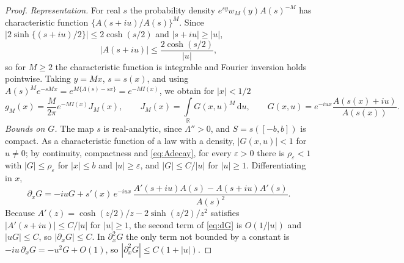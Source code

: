 \documentclass{math}
\let\TJMoriginalint\int
\renewcommand{\int}{\TJMoriginalint\limits}
\newcommand{\R}{\mathbb R}
\newcommand{\ii}{\mathit{i}}
\newcommand{\dd}{\,\mathrm d}
\begin{document}
\begin{proof}
\emph{Representation.} For real $s$ the probability density $e^{sy}w_M(y)A(s)^{-M}$ has characteristic function $\{A(s+\ii u)/A(s)\}^M$. Since $|2\sinh\{(s+\ii u)/2\}|\le2\cosh(s/2)$ and $|s+\ii u|\ge|u|$,
\begin{equation}\label{eq:Adecay}
|A(s+\ii u)|\le\frac{2\cosh(s/2)}{|u|},
\end{equation}
so for $M\ge2$ the characteristic function is integrable and Fourier inversion holds pointwise. Taking $y=Mx$, $s=s(x)$, and using $A(s)^Me^{-sMx}=e^{M\{\Lambda(s)-sx\}}=e^{-MI(x)}$, we obtain for $|x|<1/2$
\begin{equation}\label{eq:rep}
g_M(x)=\frac M{2\pi}e^{-MI(x)}J_M(x),\qquad J_M(x)=\int_{\R}G(x,u)^M\dd u,\qquad G(x,u)=e^{-\ii ux}\frac{A(s(x)+\ii u)}{A(s(x))} .
\end{equation}
\emph{Bounds on $G$.} The map $s$ is real-analytic, since $\Lambda''>0$, and $S=s([-b,b])$ is compact. As a characteristic function of a law with a density, $|G(x,u)|<1$ for $u\ne0$; by continuity, compactness and \eqref{eq:Adecay}, for every $\varepsilon>0$ there is $\rho_\varepsilon<1$ with $|G|\le\rho_\varepsilon$ for $|x|\le b$ and $|u|\ge\varepsilon$, and $|G|\le C/|u|$ for $|u|\ge1$. Differentiating in $x$,
\begin{equation}\label{eq:dG}
\partial_xG=-\ii uG+s'(x)\,e^{-\ii ux}\,\frac{A'(s+\ii u)A(s)-A(s+\ii u)A'(s)}{A(s)^2}.
\end{equation}
Because $A'(z)=\cosh(z/2)/z-2\sinh(z/2)/z^2$ satisfies $|A'(s+\ii u)|\le C/|u|$ for $|u|\ge1$, the second term of \eqref{eq:dG} is $O(1/|u|)$ and $|uG|\le C$, so $|\partial_xG|\le C$. In $\partial_x^2G$ the only term not bounded by a constant is $-\ii u\,\partial_xG=-u^2G+O(1)$, so $|\partial_x^2G|\le C(1+|u|)$.


\end{proof}
\end{document}
